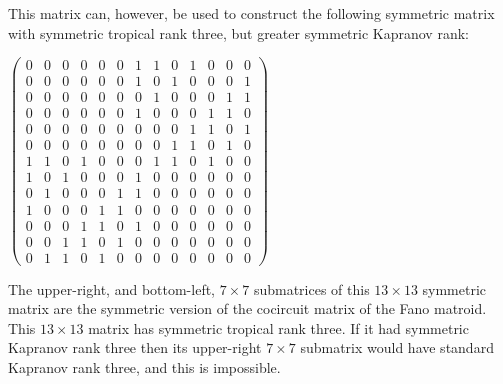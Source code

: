 \documentclass{article}
\begin{document}
This matrix can, however, be used to construct the following symmetric matrix with symmetric tropical rank three, but greater symmetric Kapranov rank:
\begin{center}
  $\left(\begin{array}{ccccccccccccc} 0 & 0 & 0 & 0 & 0 & 0 & 1 & 1 & 0 & 1 & 0 & 0 & 0 \\ 0 & 0 & 0 & 0 & 0 & 0 & 1 & 0 & 1 & 0 & 0 & 0 & 1 \\ 0 & 0 & 0 & 0 & 0 & 0 & 0 & 1 & 0 & 0 & 0 & 1 & 1 \\ 0 & 0 & 0 & 0 & 0 & 0 & 1 & 0 & 0 & 0 & 1 & 1 & 0 \\ 0 & 0 & 0 & 0 & 0 & 0 & 0 & 0 & 0 & 1 & 1 & 0 & 1 \\ 0 & 0 & 0 & 0 & 0 & 0 & 0 & 0 & 1 & 1 & 0 & 1 & 0 \\ 1 & 1 & 0 & 1 & 0 & 0 & 0 & 1 & 1 & 0 & 1 & 0 & 0 \\ 1 & 0 & 1 & 0 & 0 & 0 & 1 & 0 & 0 & 0 & 0 & 0 & 0 \\ 0 & 1 & 0 &0 & 0 & 1 & 1 & 0 & 0 & 0 & 0 & 0 & 0 \\ 1 & 0 & 0 & 0 & 1 & 1 & 0 & 0 & 0 & 0 & 0 & 0 & 0 \\ 0 & 0 & 0 & 1 & 1 & 0 & 1 & 0 & 0 & 0 & 0 & 0 & 0 \\ 0 & 0 & 1 & 1 & 0 & 1 & 0 & 0 & 0 & 0 & 0 & 0 & 0 \\ 0 & 1 & 1 & 0 & 1 & 0 & 0 & 0 & 0 & 0 & 0 & 0 & 0 \end{array}\right)$
\end{center}
The upper-right, and bottom-left, $7 \times 7$ submatrices of this $13 \times 13$ symmetric matrix are the symmetric version of the cocircuit matrix of the Fano matroid. This $13 \times 13$ matrix has symmetric tropical rank three. If it had symmetric Kapranov rank three then its upper-right $7 \times 7$ submatrix would have standard Kapranov rank three, and this is impossible.
\end{document}
